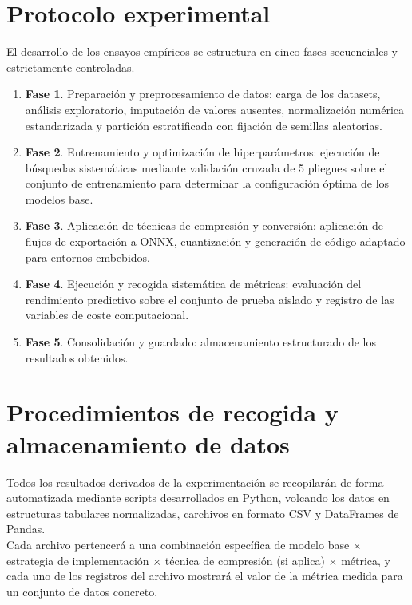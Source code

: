 \documentclass[a4paper,12pt,twoside,final]{book}
\begin{document}
\section{Protocolo experimental}
El desarrollo de los ensayos empíricos se estructura en cinco fases secuenciales y estrictamente controladas.
\begin{enumerate}
  \item \textbf{Fase 1}. Preparación y preprocesamiento de datos: carga de los datasets, análisis exploratorio,
  imputación de valores ausentes, normalización numérica estandarizada y partición estratificada con fijación de
  semillas aleatorias.
  \item \textbf{Fase 2}. Entrenamiento y optimización de hiperparámetros: ejecución de búsquedas sistemáticas mediante
  validación cruzada de 5 pliegues sobre el conjunto de entrenamiento para determinar la configuración óptima de los
  modelos base.
  \item \textbf{Fase 3}. Aplicación de técnicas de compresión y conversión: aplicación de flujos de exportación a ONNX,
  cuantización y generación de código adaptado para entornos embebidos.
  \item \textbf{Fase 4}. Ejecución y recogida sistemática de métricas: evaluación del rendimiento predictivo sobre el
  conjunto de prueba aislado y registro de las variables de coste computacional.
  \item \textbf{Fase 5}. Consolidación y guardado: almacenamiento estructurado de los resultados obtenidos.
\end{enumerate}

\section{Procedimientos de recogida y almacenamiento de datos}
Todos los resultados derivados de la experimentación se recopilarán de forma automatizada mediante scripts
desarrollados en Python, volcando los datos en estructuras tabulares normalizadas, carchivos en formato CSV y
DataFrames de Pandas.\\

Cada archivo pertencerá a una combinación específica de modelo base $\times$ estrategia de implementación $\times$
técnica de compresión (si aplica) $\times$ métrica, y cada uno de los registros del archivo mostrará el valor de la
métrica medida para un conjunto de datos concreto.
\end{document}
